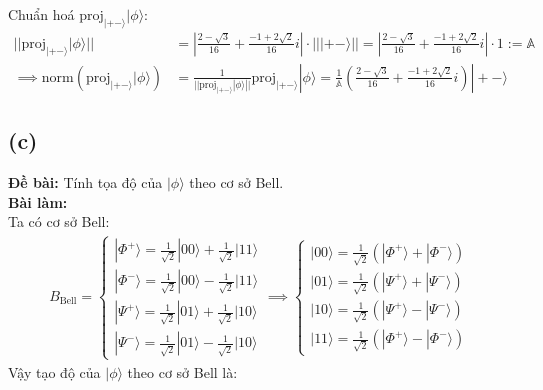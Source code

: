 Chuẩn hoá $\mathrm{proj}_{|+-\rangle}|\phi\rangle$:
\begin{align*}
    ||\mathrm{proj}_{|+-\rangle}|\phi\rangle|| & = \left|\frac{2 - \sqrt{3}}{16} + \frac{-1 + 2\sqrt{2}}{16}i\right| \cdot |||+-\rangle|| = \left|\frac{2 - \sqrt{3}}{16} + \frac{-1 + 2\sqrt{2}}{16}i\right| \cdot 1 := \mathbb{A} \\
    \implies \mathrm{norm}(\mathrm{proj}_{|+-\rangle}|\phi\rangle) & = \frac{1}{||\mathrm{proj}_{|+-\rangle}|\phi\rangle||} \mathrm{proj}_{|+-\rangle}|\phi\rangle = \frac{1}{\mathbb{A}} \left(\frac{2 - \sqrt{3}}{16} + \frac{-1 + 2\sqrt{2}}{16}i\right)|+-\rangle
\end{align*}

\subsection{(c)}
\textbf{Đề bài:} Tính tọa độ của $|\phi\rangle$ theo cơ sở Bell.\\
\textbf{Bài làm:}\\
Ta có cơ sở Bell:
\begin{align*}
    B_{\mathrm{Bell}} = \begin{cases}
        |\Phi^{+}\rangle = \frac{1}{\sqrt{2}}|00\rangle +  \frac{1}{\sqrt{2}}|11\rangle \\
        |\Phi^{-}\rangle = \frac{1}{\sqrt{2}}|00\rangle -  \frac{1}{\sqrt{2}}|11\rangle \\
        |\Psi^{+}\rangle = \frac{1}{\sqrt{2}}|01\rangle +  \frac{1}{\sqrt{2}}|10\rangle \\
        |\Psi^{-}\rangle = \frac{1}{\sqrt{2}}|01\rangle -  \frac{1}{\sqrt{2}}|10\rangle
    \end{cases}
    \implies
    \begin{cases}
        |00\rangle = \frac{1}{\sqrt{2}}(|\Phi^{+}\rangle + |\Phi^{-}\rangle) \\
        |01\rangle = \frac{1}{\sqrt{2}}(|\Psi^{+}\rangle + |\Psi^{-}\rangle) \\
        |10\rangle = \frac{1}{\sqrt{2}}(|\Psi^{+}\rangle - |\Psi^{-}\rangle) \\
        |11\rangle = \frac{1}{\sqrt{2}}(|\Phi^{+}\rangle - |\Phi^{-}\rangle)
    \end{cases}
\end{align*}
Vậy tạo độ của $|\phi\rangle$ theo cơ sở Bell là:
